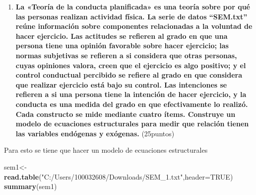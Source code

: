\documentclass[
]{article}
\newenvironment{Shaded}{\begin{snugshade}}{\end{snugshade}}
\newcommand{\AttributeTok}[1]{\textcolor[rgb]{0.13,0.29,0.53}{#1}}
\newcommand{\ConstantTok}[1]{\textcolor[rgb]{0.56,0.35,0.01}{#1}}
\newcommand{\FunctionTok}[1]{\textcolor[rgb]{0.13,0.29,0.53}{\textbf{#1}}}
\newcommand{\NormalTok}[1]{#1}
\newcommand{\OtherTok}[1]{\textcolor[rgb]{0.56,0.35,0.01}{#1}}
\newcommand{\StringTok}[1]{\textcolor[rgb]{0.31,0.60,0.02}{#1}}
\providecommand{\tightlist}{%
  \setlength{\itemsep}{0pt}\setlength{\parskip}{0pt}}
\begin{document}
\begin{enumerate}
\def\labelenumi{\arabic{enumi}.}
\setcounter{enumi}{22}
\tightlist
\item
  \textbf{La «Teoría de la conducta planificada» es una teoría sobre por
  qué las personas realizan actividad física. La serie de datos
  ``SEM.txt'' reúne información sobre componentes relacionadas a la
  voluntad de hacer ejercicio. Las actitudes se refieren al grado en que
  una persona tiene una opinión favorable sobre hacer ejercicio; las
  normas subjetivas se refieren a si considera que otras personas, cuyas
  opiniones valora, creen que el ejercicio es algo positivo; y el
  control conductual percibido se refiere al grado en que considera que
  realizar ejercicio está bajo su control. Las intenciones se refieren a
  si una persona tiene la intención de hacer ejercicio, y la conducta es
  una medida del grado en que efectivamente lo realizó. Cada constructo
  se mide mediante cuatro ítems. Construye un modelo de ecuaciones
  estructurales para medir que relación tienen las variables endógenas y
  exógenas.} (25puntos)
\end{enumerate}

Para esto se tiene que hacer un modelo de ecuaciones estructurales

\begin{Shaded}
\begin{Highlighting}[]
\NormalTok{sem1}\OtherTok{\textless{}{-}}\FunctionTok{read.table}\NormalTok{(}\StringTok{"C:/Users/100032608/Downloads/SEM\_1.txt"}\NormalTok{,}\AttributeTok{header=}\ConstantTok{TRUE}\NormalTok{)}
\FunctionTok{summary}\NormalTok{(sem1)}
\end{Highlighting}
\end{Shaded}
\end{document}
